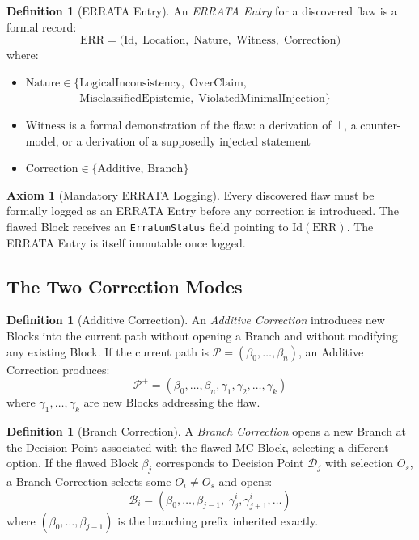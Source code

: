 \documentclass[12pt, a4paper]{article}
\theoremstyle{plain}
\theoremstyle{definition}
\newtheorem{definition}[theorem]{Definition}
\newtheorem{axiom}[theorem]{Axiom}
\theoremstyle{remark}
\newcommand{\MC}{\mathrm{MC}}
\begin{document}
\begin{definition}[ERRATA Entry]
\label{def:errata}
An \emph{ERRATA Entry} for a discovered flaw is a formal record:
\[
  \mathrm{ERR}
  = \bigl(\mathrm{Id},\;
          \mathrm{Location},\;
          \mathrm{Nature},\;
          \mathrm{Witness},\;
          \mathrm{Correction}\bigr)
\]
where:
\begin{itemize}\setlength{\itemsep}{0pt}
  \item $\mathrm{Nature} \in \{
        \mathrm{LogicalInconsistency},\;
        \mathrm{OverClaim},$\\
        $\phantom{\mathrm{Nature} \in \{}
        \mathrm{MisclassifiedEpistemic},\;
        \mathrm{ViolatedMinimalInjection}\}$
  \item $\mathrm{Witness}$ is a formal demonstration of the flaw:
        a derivation of $\bot$, a counter-model, or a derivation of
        a supposedly injected statement
  \item $\mathrm{Correction} \in \{\mathrm{Additive},\,
        \mathrm{Branch}\}$
\end{itemize}
\end{definition}

\begin{axiom}[Mandatory ERRATA Logging]
\label{ax:errata}
Every discovered flaw must be formally logged as an ERRATA Entry
before any correction is introduced. The flawed Block receives an
\texttt{ErratumStatus} field pointing to $\mathrm{Id}(\mathrm{ERR})$.
The ERRATA Entry is itself immutable once logged.
\end{axiom}

\subsection{The Two Correction Modes}
\label{subsec:modes}

\begin{definition}[Additive Correction]
\label{def:additive}
An \emph{Additive Correction} introduces new Blocks into the current
path without opening a Branch and without modifying any existing
Block. If the current path is $\mathcal{P} = (\beta_0,\ldots,\beta_n)$,
an Additive Correction produces:
\[
  \mathcal{P}^+
  = (\beta_0, \ldots, \beta_n, \gamma_1, \gamma_2, \ldots, \gamma_k)
\]
where $\gamma_1,\ldots,\gamma_k$ are new Blocks addressing the flaw.
\end{definition}

\begin{definition}[Branch Correction]
\label{def:branch-correction}
A \emph{Branch Correction} opens a new Branch at the Decision Point
associated with the flawed $\MC$ Block, selecting a different option.
If the flawed Block $\beta_j$ corresponds to Decision Point
$\mathcal{D}_j$ with selection $O_s$, a Branch Correction selects
some $O_i \neq O_s$ and opens:
\[
  \mathcal{B}_i
  = (\beta_0, \ldots, \beta_{j-1},\;
     \gamma^i_{j}, \gamma^i_{j+1}, \ldots)
\]
where $(\beta_0,\ldots,\beta_{j-1})$ is the branching prefix
inherited exactly.
\end{definition}
\end{document}
